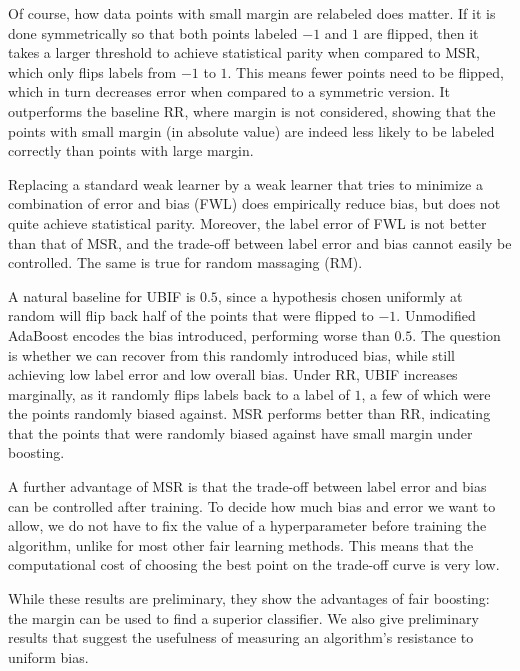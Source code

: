 \documentclass{article}
\begin{document}
Of course, how data points with small margin are relabeled does matter.  If it is done symmetrically so that both points labeled $-1$ and $1$ are flipped, then it takes a larger threshold to achieve statistical parity when compared to MSR, which only flips labels from $-1$ to $1$.  This means fewer points need to be flipped, which in turn decreases error when compared to a symmetric version.  It outperforms the baseline RR, where margin is not considered, showing that the points with small margin (in absolute value) are indeed less likely to be labeled correctly than points with large margin.


Replacing a standard weak learner by a weak learner that tries to minimize a combination of error and bias (FWL) does empirically reduce bias, but does not quite achieve statistical parity. Moreover, the label error of FWL is not better than that of MSR, and the trade-off between label error and bias cannot easily be controlled. The same is true for random massaging (RM).

A natural baseline for UBIF is $0.5$, since a hypothesis chosen uniformly at random will flip back half of the points that were flipped to $-1$.  Unmodified AdaBoost encodes the bias introduced, performing worse than $0.5$.  The question is whether we can recover from this randomly introduced bias, while still achieving low label error and low overall bias.  Under RR, UBIF increases marginally, as it randomly flips labels back to a label of $1$, a few of which were the points randomly biased against.  MSR performs better than RR, indicating that the points that were randomly biased against have small margin under boosting.

A further advantage of MSR is that the trade-off between label error and bias can be controlled after training.
To decide how much bias and error we want to allow, we do not have to fix the value of a hyperparameter before training the algorithm,
unlike for most other fair learning methods. This means that the computational cost of choosing the best point on the trade-off curve is very low.

While these results are preliminary, they show the advantages of fair boosting:  the margin can be used to find a superior classifier.  We also give preliminary results that suggest the usefulness of measuring an algorithm's resistance to uniform bias.

 




\newpage


\end{document}
